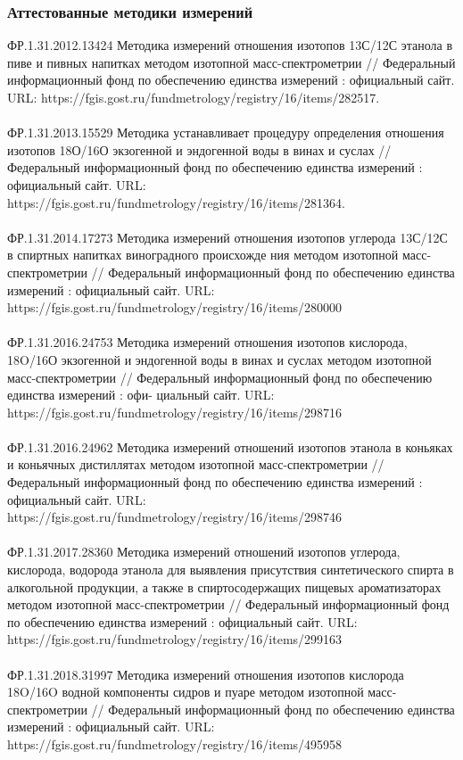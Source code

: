 \begin{frame}
\frametitle{Аттестованные методики измерений}
{\footnotesize
	ФР.1.31.2012.13424 Методика измерений отношения изотопов 13С/12С этанола в пиве и пивных напитках методом изотопной масс-спектрометрии // Федеральный информационный фонд по обеспечению единства измерений : официальный сайт.
	URL: https://fgis.gost.ru/fundmetrology/registry/16/items/282517.	\\
	~\\
	ФР.1.31.2013.15529 Методика устанавливает процедуру определения отношения изотопов 18О/16О экзогенной и эндогенной воды в винах и суслах // Федеральный информационный фонд по обеспечению единства измерений : официальный сайт.
	URL: https://fgis.gost.ru/fundmetrology/registry/16/items/281364.	\\
	~\\
	ФР.1.31.2014.17273 Методика измерений отношения изотопов углерода 13С/12С в спиртных напитках виноградного происхожде	ния методом изотопной масс-спектрометрии // Федеральный информационный фонд по обеспечению единства измерений :
	официальный сайт. URL: https://fgis.gost.ru/fundmetrology/registry/16/items/280000 	\\
	~\\
	ФР.1.31.2016.24753 Методика измерений отношения изотопов кислорода, 18O/16О экзогенной и эндогенной воды в винах и суслах методом изотопной масс-спектрометрии // Федеральный информационный фонд по обеспечению единства измерений : офи-
	циальный сайт. URL: https://fgis.gost.ru/fundmetrology/registry/16/items/298716  	\\
	~\\
	ФР.1.31.2016.24962 Методика измерений отношений изотопов этанола в коньяках и коньячных дистиллятах методом изотопной масс-спектрометрии // Федеральный информационный фонд по обеспечению единства измерений : официальный сайт.
	URL: https://fgis.gost.ru/fundmetrology/registry/16/items/298746  \\
	~\\
	ФР.1.31.2017.28360 Методика измерений отношений изотопов углерода, кислорода, водорода этанола для выявления присутствия синтетического спирта в алкогольной продукции, а также в спиртосодержащих пищевых ароматизаторах методом изотопной масс-спектрометрии // Федеральный информационный фонд по обеспечению единства измерений : официальный
	сайт. URL: https://fgis.gost.ru/fundmetrology/registry/16/items/299163  \\
	~\\
	ФР.1.31.2018.31997 Методика измерений отношения изотопов кислорода 18O/16O водной компоненты сидров и пуаре методом изотопной масс-спектрометрии // Федеральный информационный фонд по обеспечению единства измерений : официальный
	сайт. URL: https://fgis.gost.ru/fundmetrology/registry/16/items/495958 
} 
\end{frame}
  

